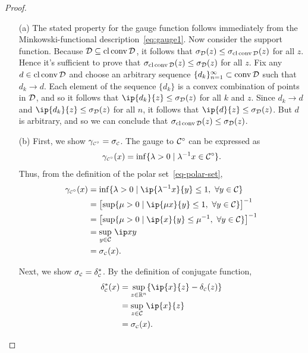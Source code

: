 \begin{proof}
  \begin{itemize}
  
  \item[(a)] The stated property for the gauge function follows immediately from
  the Minkowski-functional description~\eqref{eq:gauge1}. Now consider the support
  function.  Because $\mathcal{D} \subseteq \operatorname{cl}\operatorname{conv}\mathcal{D}$, it follows that
  $\sigma_{\mathcal{D}}(z) \leq \sigma_{\operatorname{cl}\operatorname{conv}\mathcal{D}}(z)$ for all $z$. Hence it's
  sufficient to prove that $\sigma_{\operatorname{cl}\operatorname{conv}\mathcal{D}}(z) \leq \sigma_{\mathcal{D}}(z)$ for
  all $z$. Fix any $d \in \operatorname{cl}\operatorname{conv}\mathcal{D}$ and choose an arbitrary sequence
  $\{d_k\}_{n = 1}^\infty \subset \operatorname{conv}\mathcal{D}$ such that $d_k \to d$. Each element
  of the sequence $\{d_k\}$ is a convex combination of points in $\mathcal{D}$, and so
  it follows that $\ip{d_k}{z} \leq \sigma_{\Dscr}(z)$ for all $k$ and $z$. Since
  $d_k \to d$ and $\ip{d_k}{z} \leq \sigma_{\Dscr}(z)$ for all $n$, it follows
  that $\ip{d}{z} \leq \sigma_{\Dscr}(z)$. But $d$ is arbitrary, and so we can
  conclude that $\sigma_{\operatorname{cl}\operatorname{conv}\mathcal{D}}(z) \leq \sigma_{\mathcal{D}}(z)$.
    
  \item[(b)] First, we show $\gamma_{\scriptscriptstyle\mathcal{C}^\circ} = \sigma_{\scriptscriptstyle\mathcal{C}}$. The gauge to $\mathcal{C}^\circ$
     can be expressed as
    \[\gamma_{\scriptscriptstyle\mathcal{C}^\circ}(x) = \inf\{\lambda>0 \mid \lambda^{-1} x \in
      \mathcal{C}^{\circ}\}.\] Thus, from the definition of the polar
    set~\eqref{eq-polar-set},
    \begin{align*}
      \gauge\Csp(x) &= \inf\{\lambda>0 \mid \ip{\lambda\inv x}{y} \leq 1, \ \forall y \in \Cscr\}
      \\&= \bigl[\sup\{\mu>0 \mid \ip{\mu x}{y} \leq 1,\ \forall y \in \Cscr\}\bigr]\inv
      \\&= \bigl[\sup\{\mu>0 \mid \ip{x}{y} \leq \mu\inv,\ \forall y \in \Cscr\}\bigr]\inv
      \\&= \sup_{y \in \Cscr}\, \ip x y
      \\&= \sigma\Cs(x).
  \end{align*} 
  
  Next, we show $\sigma_{\scriptscriptstyle\mathcal{C}} = \delta^*_{\scriptscriptstyle\mathcal{C}}$. By the definition of conjugate
  function,
  \begin{align*}
    \delta^*\Cs(x)  &= \sup_{z \in \Re^n} \{\ip{x}{z} - \delta\Cs(z)\}
                  \\&= \sup_{z \in \Cscr}\, \ip{x}{z}
                  \\&= \sigma\Cs(x).
  \end{align*}


\end{itemize}
\end{proof}
